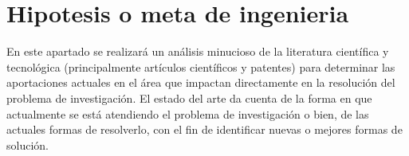 \chapter{Hipotesis o meta de ingenieria}

En este apartado se realizará un análisis minucioso de la literatura científica y
tecnológica (principalmente artículos científicos y patentes) para determinar las
aportaciones actuales en el área que impactan directamente en la resolución del problema
de investigación. El estado del arte da cuenta de la forma en que actualmente se está
atendiendo el problema de investigación o bien, de las actuales formas de resolverlo, con el
fin de identificar nuevas o mejores formas de solución.
